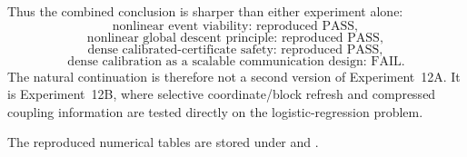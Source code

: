 Thus the combined conclusion is sharper than either experiment alone:
\begin{equation}
  \boxed{\text{nonlinear event viability: reproduced PASS}},
\end{equation}
\begin{equation}
  \boxed{\text{nonlinear global descent principle: reproduced PASS}},
\end{equation}
\begin{equation}
  \boxed{\text{dense calibrated-certificate safety: reproduced PASS}},
\end{equation}
\begin{equation}
  \boxed{\text{dense calibration as a scalable communication design: FAIL}}.
\end{equation}
The natural continuation is therefore not a second version of Experiment~12A. It is Experiment~12B, where selective coordinate/block refresh and compressed coupling information are tested directly on the logistic-regression problem.

The reproduced numerical tables are stored under
and .
